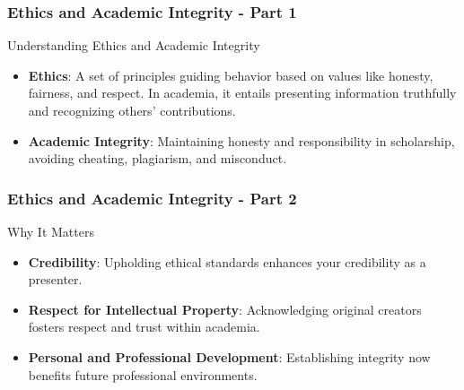 \documentclass[aspectratio=169]{beamer}
\begin{document}
\begin{frame}[fragile]
    \frametitle{Ethics and Academic Integrity - Part 1}
    \begin{block}{Understanding Ethics and Academic Integrity}
        \begin{itemize}
            \item \textbf{Ethics}: A set of principles guiding behavior based on values like honesty, fairness, and respect. In academia, it entails presenting information truthfully and recognizing others’ contributions.
            \item \textbf{Academic Integrity}: Maintaining honesty and responsibility in scholarship, avoiding cheating, plagiarism, and misconduct.
        \end{itemize}
    \end{block}
\end{frame}

\begin{frame}[fragile]
    \frametitle{Ethics and Academic Integrity - Part 2}
    \begin{block}{Why It Matters}
        \begin{itemize}
            \item \textbf{Credibility}: Upholding ethical standards enhances your credibility as a presenter.
            \item \textbf{Respect for Intellectual Property}: Acknowledging original creators fosters respect and trust within academia.
            \item \textbf{Personal and Professional Development}: Establishing integrity now benefits future professional environments.
        \end{itemize}
    \end{block}
\end{frame}
\end{document}

